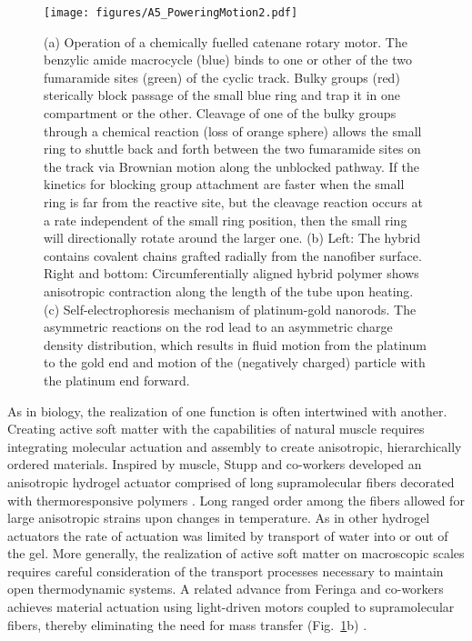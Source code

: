 \begin{appendices}
\begin{figure}[h!]
    \centering
    \texttt{[image: figures/A5\_PoweringMotion2.pdf]}
    \caption{(a) Operation of a chemically fuelled catenane rotary motor. The benzylic amide macrocycle (blue) binds to one or other of the two fumaramide sites (green) of the cyclic track. Bulky groups (red) sterically block passage of the small blue ring and trap it in one compartment or the other. Cleavage of one of the bulky groups through a chemical reaction (loss of orange sphere) allows the small ring to shuttle back and forth between the two fumaramide sites on the track via Brownian motion along the unblocked pathway. If the kinetics for blocking group attachment are faster when the small ring is far from the reactive site, but the cleavage reaction occurs at a rate independent of the small ring position, then the small ring will directionally rotate around the larger one.  (b) Left: The  hybrid contains covalent chains grafted radially from the nanofiber surface. Right and bottom: Circumferentially aligned hybrid polymer shows anisotropic contraction along the length of the tube upon heating.  (c) Self-electrophoresis mechanism of platinum-gold nanorods. The asymmetric reactions on the rod lead to an asymmetric charge density distribution, which results in fluid motion from the platinum to the gold end and motion of the (negatively charged) particle with the platinum end forward. }
    \label{fig:PoweringMotion2}
\end{figure}

As in biology, the realization of one function is often intertwined with another. Creating active soft matter with the capabilities of natural muscle requires integrating molecular actuation and assembly to create anisotropic, hierarchically ordered materials.  Inspired by muscle, Stupp and co-workers developed an anisotropic hydrogel actuator comprised of long supramolecular fibers decorated with thermoresponsive polymers \autocite{chin2018covalent}.  Long ranged order among the fibers allowed for large anisotropic strains upon changes in temperature.  As in other hydrogel actuators the rate of actuation was limited by transport of water into or out of the gel. More generally, the realization of active soft matter on macroscopic scales requires careful consideration of the transport processes necessary to maintain open thermodynamic systems. A related advance from Feringa and co-workers achieves material actuation using light-driven motors coupled to supramolecular fibers, thereby eliminating the need for mass transfer (Fig.~\ref{fig:PoweringMotion2}b) \autocite{chen2018artificial}.


\end{appendices}
